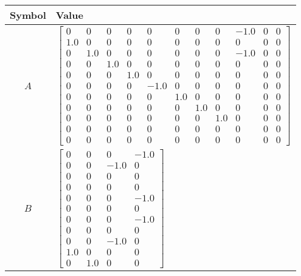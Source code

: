 \begin{tabular}{cl}
\hline
  Symbol  & Value                                                                                                                                                                                                                                                                                                                                                                                                                                                                                                                                                              \\
\hline
   $A$    & $\left[\begin{array}{ccccccccccc}0 & 0 & 0 & 0 & 0 & 0 & 0 & 0 & -1.0 & 0 & 0\\1.0 & 0 & 0 & 0 & 0 & 0 & 0 & 0 & 0 & 0 & 0\\0 & 1.0 & 0 & 0 & 0 & 0 & 0 & 0 & -1.0 & 0 & 0\\0 & 0 & 1.0 & 0 & 0 & 0 & 0 & 0 & 0 & 0 & 0\\0 & 0 & 0 & 1.0 & 0 & 0 & 0 & 0 & 0 & 0 & 0\\0 & 0 & 0 & 0 & -1.0 & 0 & 0 & 0 & 0 & 0 & 0\\0 & 0 & 0 & 0 & 0 & 1.0 & 0 & 0 & 0 & 0 & 0\\0 & 0 & 0 & 0 & 0 & 0 & 1.0 & 0 & 0 & 0 & 0\\0 & 0 & 0 & 0 & 0 & 0 & 0 & 1.0 & 0 & 0 & 0\\0 & 0 & 0 & 0 & 0 & 0 & 0 & 0 & 0 & 0 & 0\\0 & 0 & 0 & 0 & 0 & 0 & 0 & 0 & 0 & 0 & 0\end{array}\right]$ \\
   $B$    & $\left[\begin{matrix}0 & 0 & 0 & -1.0\\0 & 0 & -1.0 & 0\\0 & 0 & 0 & 0\\0 & 0 & 0 & 0\\0 & 0 & 0 & -1.0\\0 & 0 & 0 & 0\\0 & 0 & 0 & -1.0\\0 & 0 & 0 & 0\\0 & 0 & -1.0 & 0\\1.0 & 0 & 0 & 0\\0 & 1.0 & 0 & 0\end{matrix}\right]$                                                                                                                                                                                                                                                                                                                                    \\

\end{tabular}
